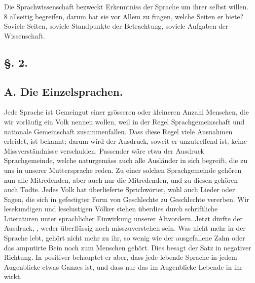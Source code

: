 Die Sprachwissenschaft bezweckt Erkenntniss der Sprache um ihrer selbst willen.  {\textbar}{\textbar}8{\textbar}{\textbar}\label{sp.8}   allseitig begreifen, darum hat sie vor Allem zu fragen, welche Seiten er biete? Soviele Seiten, soviele Standpunkte der Betrachtung, soviele Aufgaben der Wissenschaft.

\subsection*{§. 2.}\label{I.II.2}
\subsection*{A. Die Einzelsprachen.}

Jede Sprache ist Gemeingut einer grösseren oder kleineren Anzahl Menschen, die wir vorläufig ein Volk nennen wollen, weil in der Regel Sprachgemeinschaft und nationale Gemeinschaft zusammenfallen. Dass diese Regel viele Ausnahmen erleidet, ist bekannt; darum wird der Ausdruck, soweit er unzutreffend ist, keine Missverständnisse verschulden. Passender wäre etwa der Ausdruck Sprachgemeinde, welche naturgemäss auch alle Ausländer in sich begreift, die zu uns in unserer Muttersprache reden. Zu einer solchen Sprachgemeinde gehören nun alle Mitredenden, aber auch nur die Mitredenden, und zu diesen gehören auch Todte. Jedes Volk hat überlieferte Sprichwörter, wohl auch Lieder oder Sagen, die sich in gefestigter Form von Geschlechte zu Geschlechte vererben. Wir lesekundigen und leselustigen Völker stehen überdies durch schriftliche Literaturen unter  sprachlicher Einwirkung unserer Altvordern. Jetzt dürfte der Ausdruck, , weder überflüssig noch misszuverstehen sein. Was nicht mehr in der Sprache lebt, gehört nicht mehr zu ihr, so wenig wie der ausgefallene Zahn oder das amputirte Bein noch zum Menschen gehört. Dies besagt der Satz in negativer Richtung. In positiver behauptet er aber, dass jede lebende Sprache in jedem Augenblicke etwas Ganzes ist, und dass nur das im Augenblicke Lebende in ihr wirkt.

